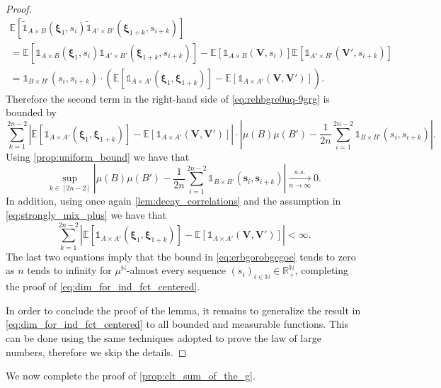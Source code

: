 \documentclass[11pt,a4paper,oneside]{article}
\theoremstyle{definition}
\theoremstyle{remark}
\def\N{\mathbb{N}}
\def\E{\mathbb{E}}
\def\R{\mathbb{R}}
\begin{document}
\begin{proof}
\begin{multline}
	\E \left[ \tilde{\mathds{1}}_{A \times B}\left(\bm \xi_1,s_i\right)  
	\tilde{\mathds{1}}_{A' \times B'}\left(\bm \xi_{1+k},s_{i+k}\right) \right]\\
	=
	\E \left[ \mathds{1}_{A \times B}\left(\bm \xi_1,s_i\right) \mathds{1}_{A' \times B'}\left(\bm \xi_{1+k},s_{i+k}\right)\right]-\E \left[ \mathds{1}_{A \times B}\left( \bm V,s_i\right)\right]\E\left[ \mathds{1}_{A' \times B'}\left(\bm V',s_{i+k}\right)\right]\\
	= \mathds{1}_{B \times B'}(s_i,s_{i+k})\cdot \left(\E \left[ \mathds{1}_{A \times A'}\left(\bm \xi_1,\bm \xi_{1+k}\right)\right]-\E \left[ \mathds{1}_{A \times A'}\left( \bm V,\bm V'\right)\right]\right).
	\end{multline}
	Therefore the second term in the right-hand side of \cref{eq:rehbgre0uq-9grg} is bounded by 
	\begin{equation}\label{eq:erbgorobgegoe}
	\sum_{k=1}^{2n-2}   \left|   \E \left[ \mathds{1}_{A \times A'}\left(\bm \xi_1,\bm \xi_{1+k}\right)\right]-\E \left[ \mathds{1}_{A \times A'}\left( \bm V,\bm V'\right)\right]\right| \cdot \left|  \mu (B)\mu(B') 	-\frac{1}{2n} \sum_{i=1}^{2n-2} \mathds{1}_{B \times B'} (s_i, s_{i+k})  \right|.
	\end{equation}
	Using \cref{prop:uniform_bound} we have that
	$$\sup_{k \in [2n-2]} \left| \mu (B)\mu(B') 	-\frac{1}{2n} \sum_{i=1}^{2n-2} \mathds{1}_{B \times B'} (\bm s_i, \bm s_{i+k})  \right| \xrightarrow[n\to\infty]{a.s.} 0.$$
	In addition, using once again \cref{lem:decay_correlations} and the assumption in \cref{eq:strongly_mix_plus} we have that  $$\sum_{k=1}^{2n-2}   \left|   \E \left[ \mathds{1}_{A \times A'}\left(\bm \xi_1,\bm \xi_{1+k}\right)\right]-\E \left[ \mathds{1}_{A \times A'}\left( \bm V,\bm V'\right)\right]\right|<\infty.$$
	The last two equations imply that the bound in \cref{eq:erbgorobgegoe} tends to zero as $n$ tends to infinity for $\mu^{\N}$-almost every sequence $(s_i)_{{i\in\N}}\in\R^{\N}_{+}$, completing the proof of \cref{eq:dim_for_ind_fct_centered}.
	
	In order to conclude the proof of the lemma, it remains to generalize the result in \cref{eq:dim_for_ind_fct_centered} to all bounded and measurable functions. This can be done using the same techniques adopted to prove the law of large numbers, therefore we skip the details.
\end{proof}


We now complete the proof of \cref{prop:clt_sum_of_the_g}.
\end{document}
